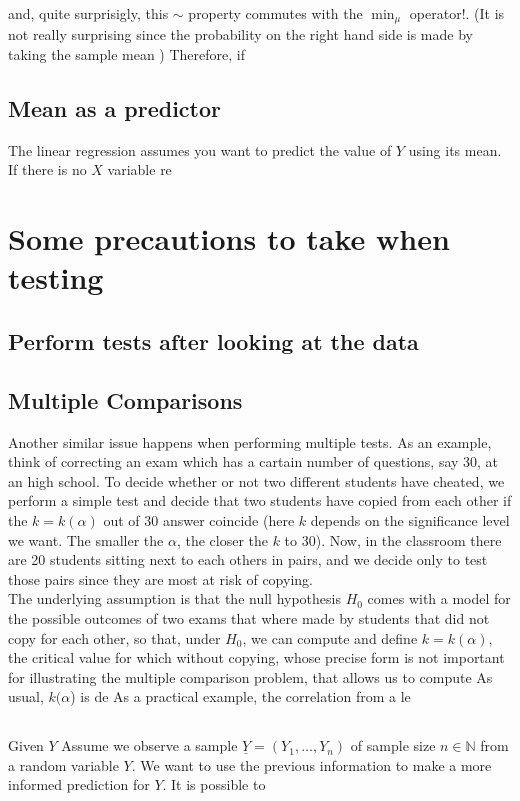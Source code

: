 	and, quite surprisigly, this $\sim$ property commutes with the $\min_{\mu}$ operator!. (It is not really surprising since the probability on the right hand side is made by taking the sample mean )
	Therefore, if 
	\subsection{ Mean as a predictor}
	
		The linear regression assumes you want to predict the value of $Y$ using its mean. If there is no $X$ variable re 
	\section{Some precautions to take when testing}
	\subsection{Perform tests after looking at the data }

	\subsection{Multiple Comparisons}

	Another similar issue happens when performing multiple tests. As an example, think of correcting an exam which  has a cartain number of questions, say 30, at an high school. To decide whether or not two different students have cheated, we perform a simple test and decide that two students have copied from each other if the $k = k(\alpha)$  out of 30 answer coincide (here $k$ depends on the significance level we want. The smaller the $\alpha$, the closer the $k$ to 30). Now, in the classroom there are 20 students sitting next to each others in pairs, and we decide only to test those pairs since they are most at risk of copying. \\
	The underlying assumption is that the null hypothesis $H_0$ comes with a model for the possible outcomes of two exams that where made by students that did not copy for each other, so that, under $H_0$, we can compute 
	and define $k = k(\alpha)$, the critical value for which without copying, whose precise form is not important for illustrating the multiple comparison problem, that allows us to compute As usual, $k(\alpha$) is de 
	As a practical example, the correlation from a le
	
	\subsection{ }
	Given $Y$ 
	Assume we observe a sample $\underline Y = (Y_1, \ldots, Y_n)$ of sample size $n \in \mathbb N$ from a random variable $Y$. We want to use the previous information to make a more informed prediction for $Y$. It is possible to  
      
